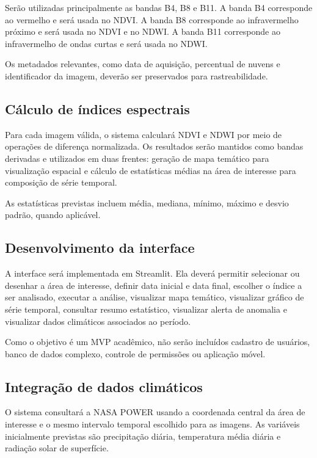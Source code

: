 Serão utilizadas principalmente as bandas B4, B8 e B11. A banda B4 corresponde ao vermelho e será usada no NDVI. A banda B8 corresponde ao infravermelho próximo e será usada no NDVI e no NDWI. A banda B11 corresponde ao infravermelho de ondas curtas e será usada no NDWI.

Os metadados relevantes, como data de aquisição, percentual de nuvens e identificador da imagem, deverão ser preservados para rastreabilidade.

\subsection{Cálculo de índices espectrais}

Para cada imagem válida, o sistema calculará NDVI e NDWI por meio de operações de diferença normalizada. Os resultados serão mantidos como bandas derivadas e utilizados em duas frentes: geração de mapa temático para visualização espacial e cálculo de estatísticas médias na área de interesse para composição de série temporal.

As estatísticas previstas incluem média, mediana, mínimo, máximo e desvio padrão, quando aplicável.

\subsection{Desenvolvimento da interface}

A interface será implementada em Streamlit. Ela deverá permitir selecionar ou desenhar a área de interesse, definir data inicial e data final, escolher o índice a ser analisado, executar a análise, visualizar mapa temático, visualizar gráfico de série temporal, consultar resumo estatístico, visualizar alerta de anomalia e visualizar dados climáticos associados ao período.

Como o objetivo é um MVP acadêmico, não serão incluídos cadastro de usuários, banco de dados complexo, controle de permissões ou aplicação móvel.

\subsection{Integração de dados climáticos}

O sistema consultará a NASA POWER usando a coordenada central da área de interesse e o mesmo intervalo temporal escolhido para as imagens. As variáveis inicialmente previstas são precipitação diária, temperatura média diária e radiação solar de superfície.

